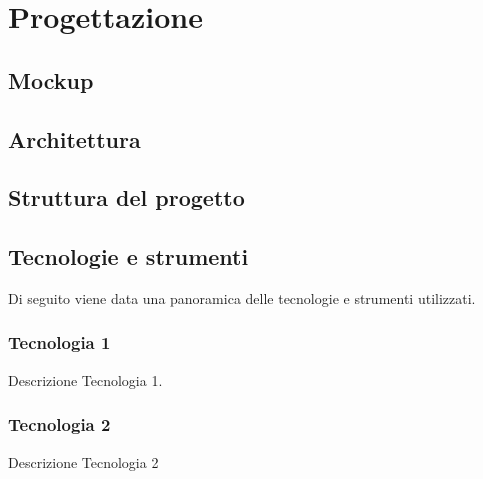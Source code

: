 \chapter{Progettazione}
\label{cap:progettazione}

\section{Mockup}
\label{sec:mockup}

\section{Architettura}
\label{sec:architettura}

\section{Struttura del progetto}
\label{sec:struttura-progetto}




\section{Tecnologie e strumenti}
\label{sec:tecnologie-strumenti}
Di seguito viene data una panoramica delle tecnologie e strumenti utilizzati.

\subsection*{Tecnologia 1}
Descrizione Tecnologia 1.

\subsection*{Tecnologia 2}
Descrizione Tecnologia 2